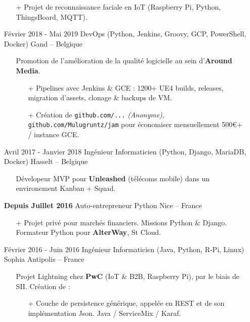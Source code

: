\documentclass{res}
\begin{document}
\begin{resume}
\begin{itemize}
\begin{itemize}
            \item[+] Projet de reconnaissance faciale en IoT (Raspberry Pi, Python, ThingsBoard, MQTT).
        \end{itemize}
        \item[] F\'evrier  2018 - Mai 2019 \tabto{5cm} DevOps (Python, Jenkins, Groovy, GCP, PowerShell, Docker) \hfill Gand -- Belgique
        \begin{itemize}
            \item[] Promotion de l'am\'elioration de la qualit\'e logicielle au sein d'\textbf{Around Media}.
            \begin{itemize}
                \item[+] Pipelines avec Jenkins \& GCE : 1200+ UE4 builds, releases, migration d'assets, clonage \& backups de VM.
                \item[+] Cr\'eation de \ifisanon \texttt{github.com/...} \textit{(Anonyme)}, \else \texttt{github.com/Mulugruntz/jam} \fi pour \'economiser mensuellement 500\euro+ / instance GCE.
            \end{itemize}
        \end{itemize}
        \item[] Avril 2017 - Janvier 2018 \tabto{5cm} Ing\'enieur Informaticien (Python, Django, MariaDB, Docker) \hfill Hasselt -- Belgique
        \begin{itemize}
            \item[] D\'evelopeur MVP pour \textbf{Unleashed} (t\'el\'ecoms mobile) dans un environement Kanban + Squad.
        \end{itemize}
        \item[] \textbf{Depuis Juillet 2016} \tabto{5cm} Auto-entrepreneur Python \hfill Nice -- France
        \begin{itemize}
            \item[+] Projet priv\'e pour march\'es financiers. Missions Python \& Django. Formateur Python pour \textbf{AlterWay}, St Cloud.
        \end{itemize}
        \item[] F\'evrier 2016 - Juin 2016 \tabto{5cm} Ing\'enieur Informaticien (Java, Python, R-Pi, Linux) \hfill Sophia Antipolis -- France
        \begin{itemize}
            \item[] Projet Lightning chez \textbf{PwC} (IoT \& B2B, Raspberry Pi), par le biais de SII. Cr\'eation de :
            \begin{itemize}
                \item[+] Couche de persistence g\'en\'erique, appel\'ee en REST et de son impl\'ementation Json. Java / ServiceMix / Karaf.

\end{itemize}
\end{itemize}
\end{itemize}
\end{resume}
\end{document}
